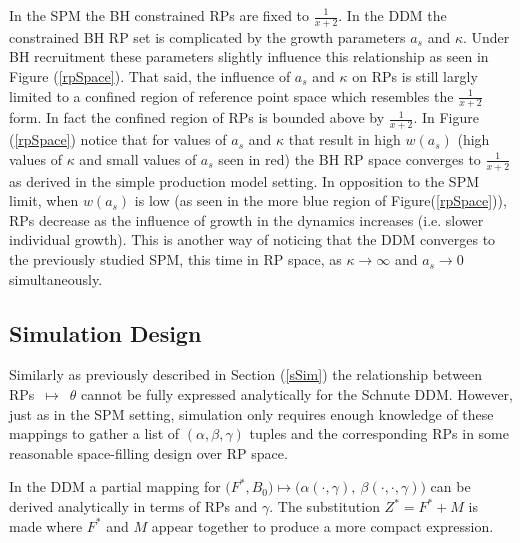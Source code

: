 %
In the SPM the BH constrained RPs are fixed to $\frac{1}{x+2}$.
In the DDM the constrained BH RP set is complicated by the growth parameters 
$a_s$ and $\kappa$. Under BH recruitment these parameters slightly %
influence this relationship as seen in Figure (\ref{rpSpace}). That said,
the influence of $a_s$ and $\kappa$ on RPs is still largly limited to a
confined region of reference point space which resembles the $\frac{1}{x+2}$
form. In fact the confined region of RPs is bounded above by $\frac{1}{x+2}$. %
In Figure (\ref{rpSpace}) notice that for values of $a_s$ and $\kappa$ that
result in high $w(a_s)$ (high values of $\kappa$ and small values of $a_s$ seen
in red) the BH RP space converges to $\frac{1}{x+2}$ as derived in the simple
production model setting. In opposition to the SPM limit, when $w(a_s)$ is low 
(as seen in the more blue region of Figure(\ref{rpSpace})), RPs decrease as 
the influence of growth in the dynamics increases (i.e. slower individual growth). 
This is another way of noticing that the DDM converges to the previously 
studied SPM, this time in RP space, as $\kappa\to\infty$ and $a_s\to0$ 
simultaneously.

%
\subsection{Simulation Design}

%
Similarly as previously described in Section (\ref{sSim}) the relationship
between \mbox{RPs $\mapsto$ $\theta$} cannot be fully expressed analytically for the
Schnute DDM. However, just as in the SPM setting, %
simulation only requires enough knowledge of these mappings to gather a list
of $(\alpha, \beta, \gamma)$ tuples and the corresponding RPs in some reasonable
space-filling design over RP space. %

In the DDM a partial mapping for
$\big(F^*, B_0\big) \mapsto \big(\alpha(\cdot, \gamma), ~\beta(\cdot, \cdot, \gamma)\big)$
can be derived analytically in terms of RPs and $\gamma$. The substitution
$Z^*=F^*+M$ is made where $F^*$ and $M$ appear together to produce a more
compact expression.

